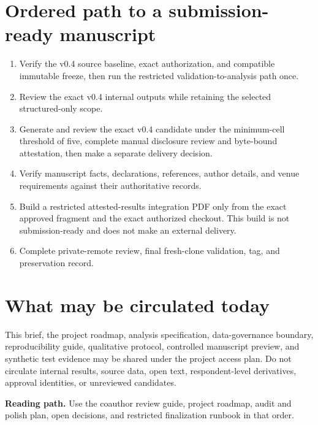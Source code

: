 \documentclass[11pt]{article}
\begin{document}
\section*{Ordered path to a submission-ready manuscript}

\begin{enumerate}
\item Verify the v0.4 source baseline, exact authorization, and compatible
immutable freeze, then run the restricted validation-to-analysis path once.
\item Review the exact v0.4 internal outputs while retaining the selected
structured-only scope.
\item Generate and review the exact v0.4 candidate under the minimum-cell threshold of
five, complete manual disclosure review and byte-bound attestation, then make
a separate delivery decision.
\item Verify manuscript facts, declarations, references, author details, and
venue requirements against their authoritative records.
\item Build a restricted attested-results integration PDF only from the exact
approved fragment and the exact authorized checkout. This build is not
submission-ready and does not make an external delivery.
\item Complete private-remote review, final fresh-clone validation, tag, and
preservation record.
\end{enumerate}

\section*{What may be circulated today}

This brief, the project roadmap, analysis specification, data-governance
boundary, reproducibility guide, qualitative protocol, controlled manuscript
preview, and synthetic test evidence may be shared under the project access
plan. Do not circulate internal results, source data, open text,
respondent-level derivatives, approval identities, or unreviewed candidates.

\smallskip
\noindent\textbf{Reading path.} Use the coauthor review guide, project
roadmap, audit and polish plan, open decisions, and restricted finalization
runbook in that order.
\end{document}
